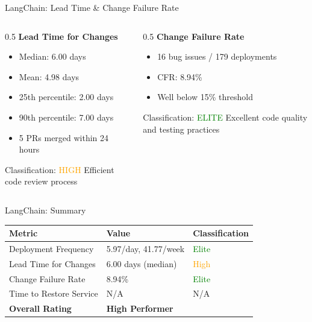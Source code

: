 \documentclass[aspectratio=169]{beamer}
\begin{document}
\begin{frame}{LangChain: Lead Time \& Change Failure Rate}
  \begin{columns}
    \begin{column}{0.5\textwidth}
      \textbf{Lead Time for Changes}
      \begin{itemize}
        \item Median: 6.00 days
        \item Mean: 4.98 days
        \item 25th percentile: 2.00 days
        \item 90th percentile: 7.00 days
        \item 5 PRs merged within 24 hours
      \end{itemize}

      \begin{block}{Classification: \textcolor{orange}{HIGH}}
        Efficient code review process
      \end{block}
    \end{column}

    \begin{column}{0.5\textwidth}
      \textbf{Change Failure Rate}
      \begin{itemize}
        \item 16 bug issues / 179 deployments
        \item CFR: 8.94\%
        \item Well below 15\% threshold
      \end{itemize}

      \begin{block}{Classification: \textcolor{green}{ELITE}}
        Excellent code quality and testing practices
      \end{block}
    \end{column}
  \end{columns}
\end{frame}

\begin{frame}{LangChain: Summary}
  \begin{table}
    \centering
    \begin{tabular}{@{}lll@{}}
      \toprule
      \textbf{Metric} & \textbf{Value} & \textbf{Classification} \\
      \midrule
      Deployment Frequency & 5.97/day, 41.77/week & \textcolor{green}{Elite} \\
      Lead Time for Changes & 6.00 days (median) & \textcolor{orange}{High} \\
      Change Failure Rate & 8.94\% & \textcolor{green}{Elite} \\
      Time to Restore Service & N/A & N/A \\
      \midrule
      \textbf{Overall Rating} & \multicolumn{2}{l}{\textbf{High Performer}} \\
      \bottomrule
    \end{tabular}
  \end{table}
\end{frame}
\end{document}
